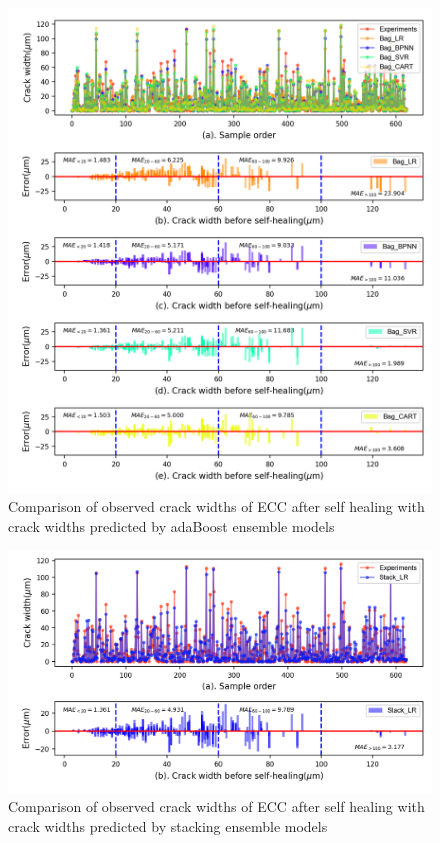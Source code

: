 \documentclass[11pt]{article}
\begin{document}
		\begin{figure}[!h]
		\centering
		\includegraphics[width=\textwidth]{c3.png}
		\caption{Comparison of observed crack widths of ECC after self healing with crack widths predicted by adaBoost ensemble models}
		\label{error3}
	\end{figure}

		\begin{figure}[!h]
	\centering
	\includegraphics[width=\textwidth]{c4.png}
	\caption{Comparison of observed crack widths of ECC after self healing with crack widths predicted by stacking ensemble models}
	\label{error4}
\end{figure}
\end{document}
